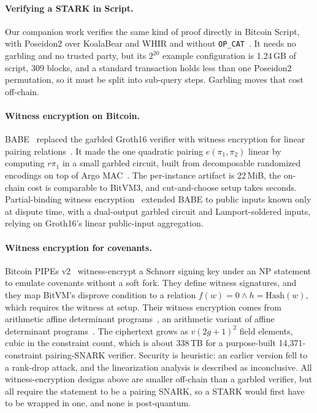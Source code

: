 \documentclass[11pt]{article}
\begin{document}
\paragraph{Verifying a STARK in Script.} Our companion work verifies the same kind
of proof directly in Bitcoin Script, with Poseidon2 over KoalaBear and WHIR and
without \texttt{OP\_CAT}~\cite{appliedpqcscript}. It needs no garbling and no
trusted party, but its $2^{20}$ example configuration is 1.24\,GB of script, 309
blocks, and a standard transaction holds less than one Poseidon2 permutation, so
it must be split into sub-query steps. Garbling moves that cost off-chain.

\paragraph{Witness encryption on Bitcoin.} BABE~\cite{babe2026} replaced the
garbled Groth16 verifier with witness encryption for linear pairing
relations~\cite{gkpw24}. It made the one quadratic pairing $e(\pi_1,\pi_2)$ linear
by computing $r\pi_1$ in a small garbled circuit, built from decomposable
randomized encodings on top of Argo MAC~\cite{el26argo}. The per-instance artifact
is 22\,MiB, the on-chain cost is comparable to BitVM3, and cut-and-choose setup
takes seconds. Partial-binding witness encryption~\cite{goatpbwe} extended BABE to
public inputs known only at dispute time, with a dual-output garbled circuit and
Lamport-soldered inputs, relying on Groth16's linear public-input aggregation.

\paragraph{Witness encryption for covenants.} Bitcoin PIPEs v2~\cite{pipesv2}
witness-encrypt a Schnorr signing key under an NP statement to emulate covenants
without a soft fork. They define witness signatures, and they map BitVM's disprove
condition to a relation $f(w)=0\wedge h=\mathrm{Hash}(w)$, which requires the
witness at setup. Their witness encryption comes from arithmetic affine
determinant programs~\cite{aadp2026}, an arithmetic variant of affine determinant
programs~\cite{bij20adp}. The ciphertext grows as $v(2g+1)^2$ field elements,
cubic in the constraint count, which is about 338\,TB for a purpose-built
14{,}371-constraint pairing-SNARK verifier. Security is heuristic: an earlier
version fell to a rank-drop attack, and the linearization analysis is described
as inconclusive. All witness-encryption designs above are smaller off-chain than a
garbled verifier, but all require the statement to be a pairing SNARK, so a STARK
would first have to be wrapped in one, and none is post-quantum.
\end{document}

